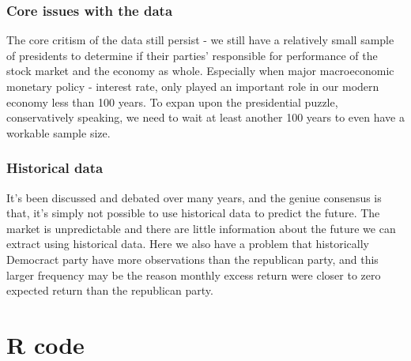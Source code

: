 \documentclass[a4paper]{article}
\begin{document}
\vspace{-10pt}
\subsubsection{Core issues with the data}
\label{Core issues with the data}
\vspace{-10pt}
 \hspace{12pt}
 The core critism of the data still persist - we still have a relatively small sample of presidents to determine if their parties' responsible for performance of the stock market and the economy as whole. Especially when major macroeconomic monetary policy - interest rate, only played an important role in our modern economy less than 100 years.  To expan upon the presidential puzzle, conservatively speaking, we need to wait at least another 100 years to even have a workable sample size.
 
 \vspace{-10pt}
\subsubsection{Historical data} 
\label{Historical data} 
\vspace{-10pt}
 \hspace{12pt} It's been discussed and debated over many years, and the geniue consensus is that, it's simply not possible to use historical data to predict the future. The market is unpredictable and there are little information about the future we can extract using historical data. Here we also have a problem that historically Democract party have more observations than the republican party, and this larger frequency may be the reason monthly excess return were closer to zero expected return than the republican party.  

\newpage
\appendix
\section{R code}
\end{document}
